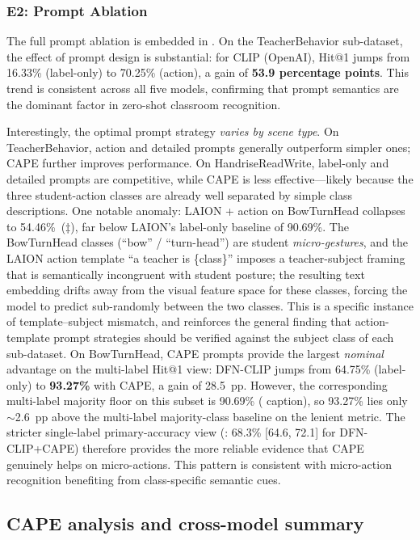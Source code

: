 \documentclass[symmetry,article,submit,pdftex,moreauthors]{Definitions/mdpi}
\begin{document}
\subsubsection{E2: Prompt Ablation}
\label{sec:e2}

The full prompt ablation is embedded in .
On the TeacherBehavior sub-dataset, the effect of prompt design is substantial: for CLIP (OpenAI), Hit@1 jumps from 16.33\% (label-only) to 70.25\% (action), a gain of \textbf{53.9 percentage points}.
This trend is consistent across all five models, confirming that prompt semantics are the dominant factor in zero-shot classroom recognition.

Interestingly, the optimal prompt strategy \emph{varies by scene type}.
On TeacherBehavior, action and detailed prompts generally outperform simpler ones; CAPE further improves performance.
On HandriseReadWrite, label-only and detailed prompts are competitive, while CAPE is less effective---likely because the three student-action classes are already well separated by simple class descriptions.
One notable anomaly: LAION + action on BowTurnHead collapses to 54.46\%~($\ddagger$), far below LAION's label-only baseline of 90.69\%.
The BowTurnHead classes (``bow'' / ``turn-head'') are student \emph{micro-gestures}, and the LAION action template ``a teacher is \{class\}'' imposes a teacher-subject framing that is semantically incongruent with student posture; the resulting text embedding drifts away from the visual feature space for these classes, forcing the model to predict sub-randomly between the two classes.
This is a specific instance of template--subject mismatch, and reinforces the general finding that action-template prompt strategies should be verified against the subject class of each sub-dataset.
On BowTurnHead, CAPE prompts provide the largest \emph{nominal} advantage on the multi-label Hit@1 view: DFN-CLIP jumps from 64.75\% (label-only) to \textbf{93.27\%} with CAPE, a gain of 28.5~pp. However, the corresponding multi-label majority floor on this subset is 90.69\% ( caption), so 93.27\% lies only $\sim$2.6~pp above the multi-label majority-class baseline on the lenient metric. The stricter single-label primary-accuracy view (: 68.3\% [64.6, 72.1] for DFN-CLIP+CAPE) therefore provides the more reliable evidence that CAPE genuinely helps on micro-actions.
This pattern is consistent with micro-action recognition benefiting from class-specific semantic cues.

\subsection{CAPE analysis and cross-model summary}
\end{document}
